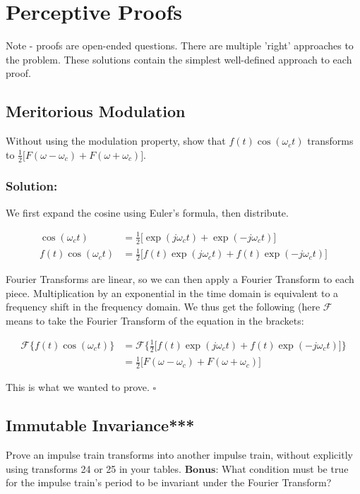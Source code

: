 \documentclass{article}
\begin{document}
\section{Perceptive Proofs}
Note - proofs are open-ended questions. There are multiple 'right' approaches to the problem. These solutions contain the simplest well-defined approach to each proof.

\subsection{Meritorious Modulation}
Without using the modulation property, show that $f(t)\cos(\omega_c t)$ transforms to $\frac{1}{2}\big[F(\omega - \omega_c) + F(\omega + \omega_c)\big]$.

\subsubsection{Solution:}

We first expand the cosine using Euler's formula, then distribute.


\begin{equation*}
\begin{split}
\cos(\omega_c t) &= \frac{1}{2}\big[\exp(j\omega_c t) + \exp(-j\omega_c t)\big]
\\
f(t)\cos(\omega_c t) &= \frac{1}{2}\big[f(t)\exp(j\omega_c t) + f(t)\exp(-j\omega_c t)\big]
\end{split}
\end{equation*}

Fourier Transforms are linear, so we can then apply a Fourier Transform to each piece. Multiplication by an exponential in the time domain is equivalent to a frequency shift in the frequency domain. We thus get the following (here $\mathcal{F}$ means to take the Fourier Transform of the equation in the brackets:

\begin{equation*}
\begin{split}
\mathcal{F}\{f(t)\cos(\omega_ct)\} &= \mathcal{F}\bigg\{\frac{1}{2}\big[f(t)\exp(j\omega_c t) + f(t)\exp(-j\omega_c t)\big]\bigg\}\\
&= \frac{1}{2}\big[F(\omega - \omega_c) + F(\omega + \omega_c)\big]
\end{split}
\end{equation*}

This is what we wanted to prove. $\square$

\newpage

\subsection{Immutable Invariance***}
Prove an impulse train transforms into another impulse train, without explicitly using transforms 24 or 25 in your tables. $\textbf{Bonus:}$ What condition must be true for the impulse train's period to be invariant under the Fourier Transform?
\end{document}
